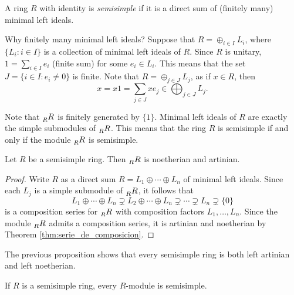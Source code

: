 \begin{definition}
    A ring $R$ with identity is \emph{semisimple} if it is a direct sum of (finitely many) 
    minimal left ideals. 
\end{definition}

Why finitely many minimal left ideals?
Suppose that $R=\oplus_{i\in I}L_i$, where $\{L_i:i\in I\}$ is a collection of
minimal left ideals of $R$. 
Since $R$ is unitary, $1=\sum_{i\in I}e_i$ (finite sum) for 
some $e_i\in L_i$. This means that the set $J=\{i\in I:e_i\ne 0\}$ is finite.
Note that $R=\oplus_{j\in J}L_j$, as 
if $x\in R$, then 
\[
x=x1=\sum_{j\in J}xe_j\in \bigoplus_{j\in J}L_j.
\]

Note
that $\prescript{}{R}{R}$ is finitely generated by $\{1\}$. Minimal left ideals of $R$ 
are exactly the simple submodules of $\prescript{}{R}{R}$. 
This means that 
the ring $R$ is semisimple if and only if the module
$\prescript{}{R}{R}$ is semisimple.  

\begin{proposition}
    Let $R$ be a semisimple ring. Then $\prescript{}{R}{R}$ is noetherian and artinian.
\end{proposition}

\begin{proof}
    Write $R$ as a direct sum $R=L_1\oplus\cdots\oplus L_n$ of minimal left ideals. Since 
    each $L_j$ is a simple submodule of $\prescript{}{R}{R}$, it follows that 
    \[
    L_1\oplus\cdots\oplus L_n\supsetneq L_2\oplus\cdots\oplus L_n\supsetneq\cdots\supsetneq L_n\supsetneq\{0\}
    \]
    is a composition series for $\prescript{}{R}{R}$ with composition factors
    $L_1,\dots,L_n$. Since the module $\prescript{}{R}{R}$ admits a composition
    series, it is artinian and noetherian by Theorem \ref{thm:serie_de_composicion}. 
\end{proof}

The previous proposition shows 
that every semisimple ring is both left artinian and left noetherian. 

\begin{exercise}
\label{xca:semisimple}
    If $R$ is a semisimple ring, every $R$-module is semisimple. 
\end{exercise}


